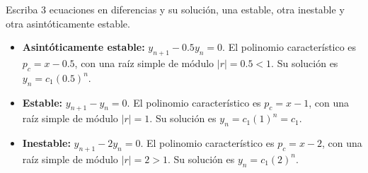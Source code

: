 \begin{ejer}[2]
Escriba 3 ecuaciones en diferencias y su solución, una estable, otra inestable y otra asintóticamente estable.
\end{ejer}
\begin{sol}
\begin{itemize}
    \item \textbf{Asintóticamente estable:} $y_{n+1} - 0.5 y_n = 0$.
    El polinomio característico es $p_c = x - 0.5$, con una raíz simple de módulo $\vert{}r\vert{} = 0.5 < 1$.
    Su solución es $y_n = c_1 \left(0.5\right)^n$.
    \item \textbf{Estable:} $y_{n+1} - y_n = 0$.
    El polinomio característico es $p_c = x - 1$, con una raíz simple de módulo $\vert{}r\vert{} = 1$.
    Su solución es $y_n = c_1 (1)^n = c_1$.
    \item \textbf{Inestable:} $y_{n+1} - 2 y_n = 0$.
    El polinomio característico es $p_c = x - 2$, con una raíz simple de módulo $\vert{}r\vert{} = 2 > 1$.
    Su solución es $y_n = c_1 (2)^n$.
\end{itemize}
\end{sol}

\vspace{0.5cm}

